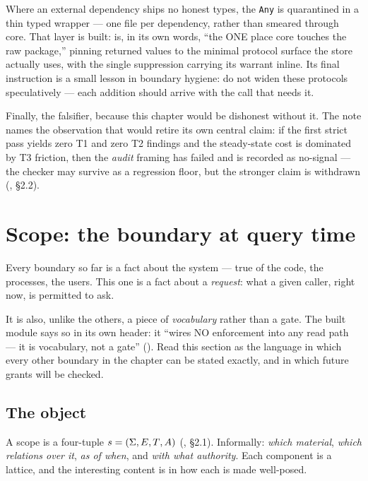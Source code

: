 Where an external dependency ships no honest types, the \texttt{Any} is quarantined
in a thin typed wrapper --- one file per dependency, rather than smeared through
core. That layer is built:  is, in its
own words, ``the ONE place core touches the raw package,'' pinning returned values
to the minimal protocol surface the store actually uses, with the single
suppression carrying its warrant inline. Its final instruction is a small lesson in
boundary hygiene: do not widen these protocols speculatively --- each addition
should arrive with the call that needs it.

Finally, the falsifier, because this chapter would be dishonest without it. The
note names the observation that would retire its own central claim: if the first
strict pass yields zero T1 and zero T2 findings and the steady-state cost is
dominated by T3 friction, then the \emph{audit} framing has failed and is recorded
as no-signal --- the checker may survive as a regression floor, but the stronger
claim is withdrawn (, \S 2.2).

\section{Scope: the boundary at query time}
\label{sec:scope}

Every boundary so far is a fact about the system --- true of the code, the
processes, the users. This one is a fact about a \emph{request}: what a given
caller, right now, is permitted to ask.

It is also, unlike the others, a piece of \emph{vocabulary} rather than a gate. The
built module says so in its own header: it ``wires NO enforcement into any read
path --- it is vocabulary, not a gate''
(). Read this section as the language in
which every other boundary in the chapter can be stated exactly, and in which future
grants will be checked.

\subsection*{The object}

A scope is a four-tuple $s{} = (\Sigma{}, E{}, T{},
A{})$ (, \S 2.1). Informally: \emph{which
material}, \emph{which relations over it}, \emph{as of when}, and \emph{with what
authority}. Each component is a lattice, and the interesting content is in how each
is made well-posed.

